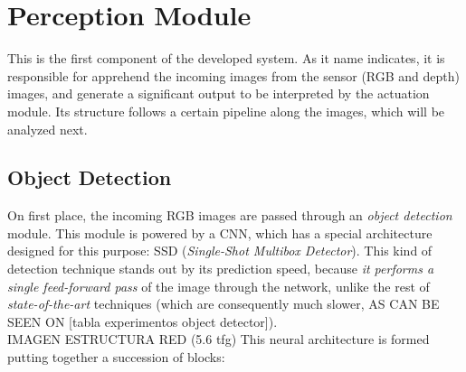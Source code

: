 \section{Perception Module}

This is the first component of the developed system. As it name indicates, it is responsible for apprehend the incoming images from the sensor (RGB and depth) images, and generate a significant output to be interpreted by the actuation module. Its structure follows a certain pipeline along the images, which will be analyzed next.


\subsection{Object Detection}

On first place, the incoming RGB images are passed through an \emph{object detection} module. This module is powered by a CNN, which has a special architecture designed for this purpose: SSD (\emph{Single-Shot Multibox Detector}). This kind of detection technique stands out by its prediction speed, because \emph{it performs a single feed-forward pass} of the image through the network, unlike the rest of \emph{state-of-the-art} techniques (which are consequently much slower, AS CAN BE SEEN ON [tabla experimentos object detector]).\\


IMAGEN ESTRUCTURA RED (5.6 tfg)
This neural architecture is formed putting together a succession of blocks:


